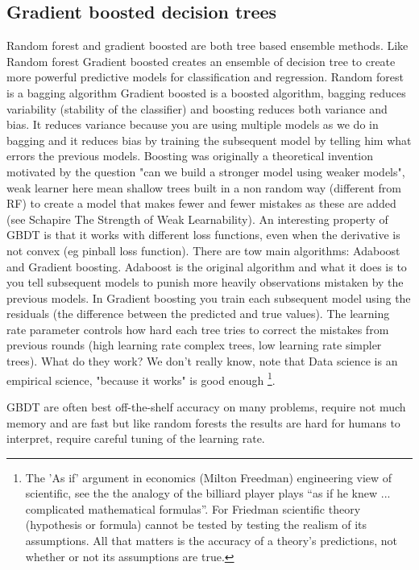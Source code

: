 \documentclass[11pt]{article}
\begin{document}
\subsection{Gradient boosted decision trees}
Random forest and gradient boosted are both tree based ensemble methods. Like Random forest Gradient boosted creates an ensemble of decision tree to create more powerful predictive models for classification and regression. Random forest is a bagging algorithm Gradient boosted is a boosted algorithm, bagging reduces variability (stability of the classifier) and boosting reduces both variance and bias. It reduces variance because you are using multiple models as we do in bagging and it reduces bias by training the subsequent model by telling him what errors the previous models.
Boosting was originally a theoretical invention motivated by the question "can we build a stronger model using weaker models", weak learner here mean shallow trees built in a non random way (different from RF) to create a model that makes fewer and fewer mistakes as these are added (see Schapire The Strength of Weak Learnability). An interesting property of GBDT is that it works with different loss functions, even when the derivative is not convex (eg pinball loss function). %
 There are tow main algorithms: Adaboost and Gradient boosting. Adaboost is the original algorithm and what it does is to you tell subsequent models to punish more heavily observations mistaken by the previous models. In Gradient boosting you train each subsequent model using the residuals (the difference between the predicted and true values). The learning rate parameter controls how hard each tree tries to correct the mistakes from previous rounds (high learning rate complex trees, low learning rate simpler trees). 
What do they work? We don't really know, note that Data science is an empirical science, "because it works" is good enough \footnote{The 'As if' argument in economics (Milton Freedman) engineering view of scientific, see the the analogy of the billiard player plays “as if he knew ... complicated mathematical formulas”. For Friedman scientific theory (hypothesis or formula) cannot be tested by testing the realism of its assumptions.  All that matters is the accuracy of a theory’s predictions, not whether or not its assumptions are true. }. %

GBDT are often best off-the-shelf accuracy on many problems, require not much memory and are fast but like random forests the results are hard for humans to interpret, require careful tuning of the learning rate.
\end{document}
